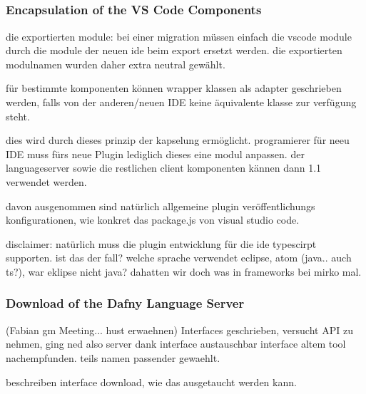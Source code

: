 \textbf{}\\

\textbf{}\\

\textbf{}\\

\textbf{}\\






\subsubsection{Encapsulation of the VS Code Components}

die exportierten module:
bei einer migration müssen einfach die vscode module durch die module der neuen ide beim export ersetzt werden.
die exportierten modulnamen wurden daher extra neutral gewählt.

für bestimmte komponenten können wrapper klassen als adapter geschrieben werden, falls von
der anderen/neuen IDE keine äquivalente klasse zur verfügung steht.

dies  wird durch dieses prinzip der kapselung ermöglicht.
programierer für neeu IDE muss fürs neue Plugin lediglich dieses eine modul anpassen.
der languageserver sowie die restlichen client komponenten kännen dann 1.1 verwendet werden.

davon ausgenommen sind natürlich allgemeine plugin veröffentlichungs konfigurationen, wie konkret
das package.js von visual studio code.

disclaimer: natürlich muss die plugin entwicklung für die ide typescirpt supporten.
ist das der fall? welche sprache verwendet eclipse, atom (java.. auch ts?),
war eklipse nicht java? dahatten wir doch was in frameworks bei mirko mal.

\subsubsection{Download of the Dafny Language Server}
\label{section:implementation:client:download}
  (Fabian gm Meeting... hust erwaehnen)
Interfaces geschrieben, versucht API zu nehmen, ging ned also server
dank interface austauschbar
interface altem tool nachempfunden. teils namen passender gewaehlt.

beschreiben interface download, wie das ausgetaucht werden kann.

